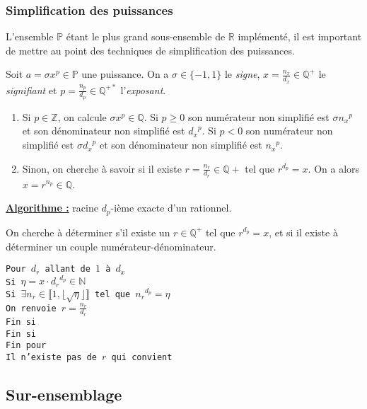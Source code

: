 \documentclass[french]{article}
\newcommand{\tab}{\hspace*{5mm}}
\newcommand{\floor}[1]{\lfloor #1 \rfloor} %
\begin{document}
\subsubsection{Simplification des puissances}

L'ensemble $\mathbb{P}$ étant le plus grand sous-ensemble de $\mathbb{R}$ implémenté, il est important de mettre au point des techniques de simplification des puissances.

Soit $a = \sigma x ^ p \in \mathbb{P}$ une puissance. On a $\sigma \in \{-1, 1\}$ le \textit{signe}, $x = \frac{n_x}{d_x} \in \mathbb{Q}^+$ le \textit{signifiant} et $p = \frac{n_p}{d_p} \in \mathbb{Q}^{+*}$ l'\textit{exposant}.

\begin{enumerate}
  \item Si $p \in \mathbb{Z}$, on calcule $\sigma x ^ p \in \mathbb{Q}$. Si $p \ge 0$ son numérateur non simplifié est $\sigma {n_x}^p$ et son dénominateur non simplifié est ${d_x}^p$. Si $p < 0$ son numérateur non simplifié est $\sigma {d_x}^p$ et son dénominateur non simplifié est ${n_x}^p$.
  \item Sinon, on cherche à savoir si il existe $r = \frac{n_r}{d_r} \in \mathbb{Q}+$ tel que $r^{d_p} = x$. On a alors $x = r^{n_p} \in \mathbb{Q}$.
\end{enumerate}

\noindent \textbf{\underline{Algorithme :}} racine $d_p$-ième exacte d'un rationnel.

\noindent On cherche à déterminer s'il existe un $r \in \mathbb{Q}^+$ tel que $r^{d_p} = x$, et si il existe à déterminer un couple numérateur-dénominateur.

\noindent\texttt{Pour $d_r$ allant de $1$ à $d_x$ \\
\tab Si $\eta = x \cdot {d_r}^{d_p} \in \mathbb{N}$ \\
\tab\tab Si $\exists n_r \in \llbracket 1, \floor{\sqrt{\eta}} \rrbracket$ tel que ${n_r}^{d_p} = \eta$ \\
\tab\tab\tab On renvoie $r = \frac{n_r}{d_r}$ \\
\tab\tab Fin si \\
\tab Fin si \\
Fin pour\\
Il n'existe pas de $r$ qui convient}


\subsection{Sur-ensemblage}
\end{document}
